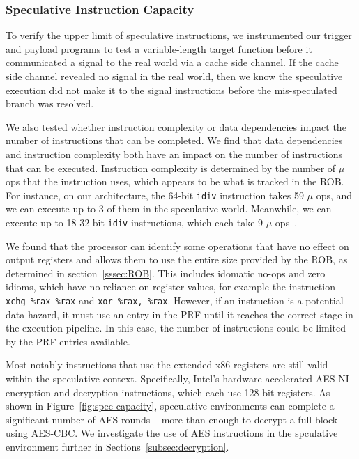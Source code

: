 
\subsubsection{Speculative Instruction Capacity}

To verify the upper limit of speculative instructions,
we instrumented our trigger and payload programs to test a variable-length target
function before it communicated a signal to the real world via a cache side
channel. If the cache side channel revealed no signal in the real world, then we know the
speculative execution did not make it to the signal instructions before the
mis-speculated branch was resolved.

We also tested whether instruction complexity or data dependencies impact
the number of instructions that can be completed. We find that data dependencies
and instruction complexity both have an impact on the number of instructions
that can be executed. Instruction complexity is determined by the number of
$\mu$ ops that the instruction uses, which appears to be what is tracked in the ROB.
For instance, on our architecture, the 64-bit \texttt{idiv} instruction takes 59
$\mu$ ops, and we can execute up to 3 of them in the speculative world.
Meanwhile, we can execute up to 18 32-bit \texttt{idiv} instructions, which each
take 9 $\mu$ ops~\cite{intel-instruction-tables}.

We found that the processor can identify
some operations that have no effect on output registers and allows them to use the 
entire size provided by the ROB, as determined in section~\ref{sssec:ROB}. This includes 
idomatic no-ops and zero idioms, which have no reliance on register values, 
for example the instruction \texttt{xchg \%rax \%rax} and \texttt{xor \%rax, \%rax}. 
However, if an instruction is a potential data hazard, it must use an entry in the PRF
until it reaches the correct stage in the execution pipeline. In this case, the number 
of instructions could be limited by the PRF entries available.


Most notably instructions that use the extended x86 registers are still
valid within the speculative context. Specifically, Intel's hardware accelerated AES-NI
encryption and decryption instructions, which each use 128-bit registers.
As shown in Figure~\ref{fig:spec-capacity}, speculative environments can complete
a significant number of AES rounds -- more than enough to decrypt a full block 
using AES-CBC. We investigate the use of AES instructions in the spculative environment
further in Sections~\ref{subsec:decryption}.

